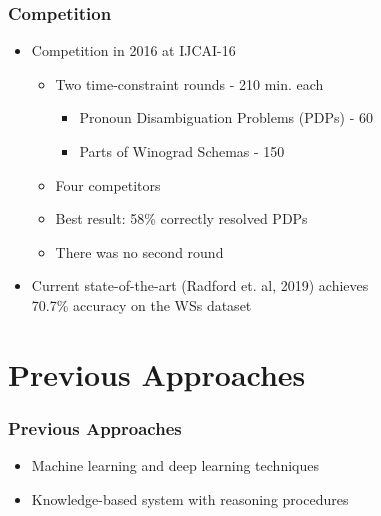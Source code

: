 \documentclass[c,8pt,xcolor...,x11names]{beamer}
\begin{document}
\begin{frame}
\frametitle{Competition}
	\begin{itemize}
	\normalsize
	\item Competition in 2016 at IJCAI-16
	\begin{itemize}
		\normalsize
		\item Two time-constraint rounds - 210 min. each
		\begin{itemize}
			\normalsize
			\item Pronoun Disambiguation Problems (PDPs) - 60
			\item Parts of Winograd Schemas - 150
		\end{itemize}
		\item Four competitors
		\item Best result: 58\% correctly resolved PDPs
		\item There was no second round
		
	\end{itemize}
	
	\item Current \alert{state-of-the-art} (Radford et. al, 2019) achieves \\ 70.7\% accuracy on the WSs dataset
\end{itemize}
\end{frame}

\section{Previous Approaches}

\begin{frame}
\frametitle{Previous Approaches}
\begin{itemize}
	\item Machine learning and deep learning techniques
	\item Knowledge-based system with reasoning procedures
\end{itemize}


\end{frame}
\end{document}
